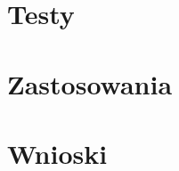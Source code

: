 \documentclass[a4paper]{article}
\begin{document}
\section{Testy}
\section{Zastosowania}
\section{Wnioski}
\end{document}
